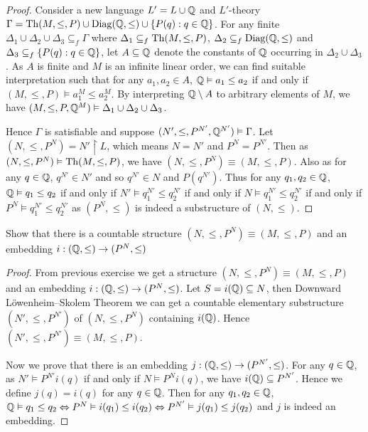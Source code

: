 \documentclass[11pt]{article}
\begin{document}
\begin{proof}
Consider a new language \(L'=L\cup\mathbb{Q}\) and \(L'\)-theory \(\Gamma =\operatorname{Th}(M,\le,P)\cup\operatorname{Diag}(\mathbb{Q},\le)\cup\{P(q):q\in\mathbb{Q}\}\).
For any finite \(\Delta_1\cup\Delta_2\cup\Delta_3\subseteq_f\Gamma\) where \(\Delta_1\subseteq_f\operatorname{Th}(M,\le,P)\), \(\Delta_2\subseteq_f\operatorname{Diag}(\mathbb{Q},\le)\)
and \(\Delta_3\subseteq_f\{P(q):q\in\mathbb{Q}\}\), let \(A\subseteq\mathbb{Q}\) denote the constants of \(\mathbb{Q}\) occurring in \(\Delta_2\cup\Delta_3\). As \(A\)
is finite and \(M\) is an infinite linear order, we can find suitable interpretation such that for
any \(a_1,a_2\in A\), \(\mathbb{Q}\vDash a_1\le a_2\) if and only if \((M,\le,P)\vDash a_1^M\le a_2^M\). By interpreting \(\mathbb{Q}\setminus A\) to
arbitrary elements of \(M\), we have \((M,\le,P,\mathbb{Q}^M)\vDash\Delta_1\cup\Delta_2\cup\Delta_3\).

Hence \(\Gamma\) is satisfiable and
suppose \((N',\le,P^{N'},\mathbb{Q}^{N'})\vDash\Gamma\). Let \((N,\le,P^N)=N'\upharpoonright L\), which means \(N=N'\) and \(P^N=P^{N'}\).
Then as \((N,\le,P^N)\vDash\operatorname{Th}(M,\le,P)\), we have \((N,\le,P^N)\equiv(M,\le,P)\). Also as for
any \(q\in\mathbb{Q}\), \(q^{N'}\in N'\) and so \(q^{N'}\in N\) and \(P(q^{N'})\). Thus for
any \(q_1,q_2\in\mathbb{Q}\), \(\mathbb{Q}\vDash q_1\le q_2\) if and only if \(N'\vDash q_1^{N'}\le q_2^{N'}\) if and only
if \(N\vDash q_1^{N'}\le q_2^{N'}\) if and only if \(P^N\vDash q_1^{N'}\le q_2^{N'}\) as \((P^N,\le)\) is indeed a
substructure of \((N,\le)\).
\end{proof}


\begin{exercise}
Show that there is a countable structure \((N,\le,P^N)\equiv(M,\le,P)\) and an embedding \(i:(\mathbb{Q},\le)\to(P^N,\le)\)
\end{exercise}

\begin{proof}
From previous exercise we get a structure \((N,\le,P^N)\equiv(M,\le,P)\) and an embedding \(i:(\mathbb{Q},\le)\to(P^N,\le)\).
Let \(S=i(\mathbb{Q})\subseteq N\), then Downward Löwenheim–Skolem Theorem we can get a countable elementary
substructure \((N',\le,P^{N'})\) of \((N,\le,P^N)\) containing \(i(\mathbb{Q})\). Hence \((N',\le,P^{N'})\equiv(M,\le,P)\).

Now we prove that there is an embedding \(j:(\mathbb{Q},\le)\to(P^{N'},\le)\).
For any \(q\in\mathbb{Q}\), as \(N'\vDash P^{N'}i(q)\) if and only if \(N\vDash P^Ni(q)\), we have \(i(\mathbb{Q})\subseteq P^{N'}\). Hence
we define \(j(q)=i(q)\) for any \(q\in\mathbb{Q}\). Then for
any \(q_1,q_2\in\mathbb{Q}\), \(\mathbb{Q}\vDash q_1\le q_2\Leftrightarrow P^N\vDash i(q_1)\le i(q_2)\Leftrightarrow P^{N'}\vDash j(q_1)\le j(q_2)\) and \(j\) is indeed an embedding.
\end{proof}
\end{document}
